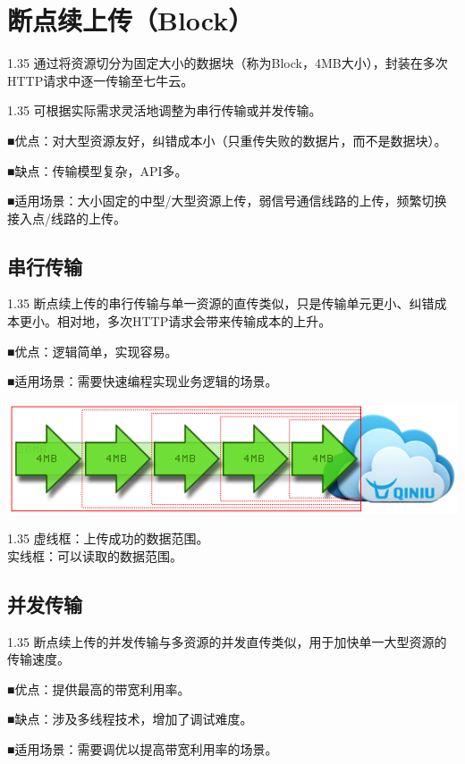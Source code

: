 \documentclass[11pt, oneside]{book}
\newcommand{\qpara}[1]{
\vspace{0.2em}
\begin{spacing}{1.35}
\noindent
#1\par
\end{spacing}
\vspace{0.2em}
}
\newcommand{\qblock}[1]{
\vspace{0.1em}
\noindent
#1\par
\vspace{0.1em}
}
\begin{document}
\section{断点续上传（Block）}

\qpara{通过将资源切分为固定大小的数据块（称为Block，4MB大小），封装在多次HTTP请求中逐一传输至七牛云。}
\qpara{可根据实际需求灵活地调整为串行传输或并发传输。}
\qblock{■\thinspace 优点：对大型资源友好，纠错成本小（只重传失败的数据片，而不是数据块）。}
\qblock{■\thinspace 缺点：传输模型复杂，API多。}
\qblock{■\thinspace 适用场景：大小固定的中型/大型资源上传，弱信号通信线路的上传，频繁切换接入点/线路的上传。}

\subsection{串行传输}

\qpara{断点续上传的串行传输与单一资源的直传类似，只是传输单元更小、纠错成本更小。相对地，多次HTTP请求会带来传输成本的上升。}
\qblock{■\thinspace 优点：逻辑简单，实现容易。}
\qblock{■\thinspace 适用场景：需要快速编程实现业务逻辑的场景。}

\begin{center}
\includegraphics[scale=1]{../pics/upload/one_rput.png}
\end{center}

\qpara{虚线框：上传成功的数据范围。 \\ 实线框：可以读取的数据范围。}

\subsection{并发传输}

\qpara{断点续上传的并发传输与多资源的并发直传类似，用于加快单一大型资源的传输速度。}
\qblock{■\thinspace 优点：提供最高的带宽利用率。}
\qblock{■\thinspace 缺点：涉及多线程技术，增加了调试难度。}
\qblock{■\thinspace 适用场景：需要调优以提高带宽利用率的场景。}
\end{document}
